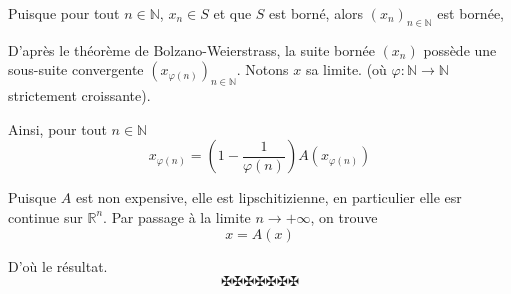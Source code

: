 Puisque pour tout $n \in \mathbb{N}$, $x_n \in S$ et que $S$ est born{\'e},
alors $(x_n)_{n \in \mathbb{N}}$ est born{\'e}e,

D'apr{\`e}s le th{\'e}or{\`e}me de Bolzano-Weierstrass, la suite born{\'e}e
$(x_n)$ poss{\`e}de une sous-suite convergente $(x_{\varphi (n)})_{n \in
\mathbb{N}}$. Notons $x$ sa limite. (o{\`u} $\varphi : \mathbb{N} \rightarrow
\mathbb{N}$ strictement croissante).

Ainsi, pour tout $n \in \mathbb{N}$
\[ x_{\varphi (n)} = \left( 1 - \frac{1}{\varphi (n)} \right) A (x_{\varphi
   (n)}) \]


Puisque $A$ est non expensive, elle est lipschitizienne, en particulier elle
esr continue sur $\mathbb{R}^n$. Par passage {\`a} la limite $n \rightarrow +
\infty$, on trouve
\[ x = A (x) \]


D'o{\`u} le r{\'e}sultat.
\[ \maltese \maltese \maltese \maltese \maltese \maltese \maltese \]
